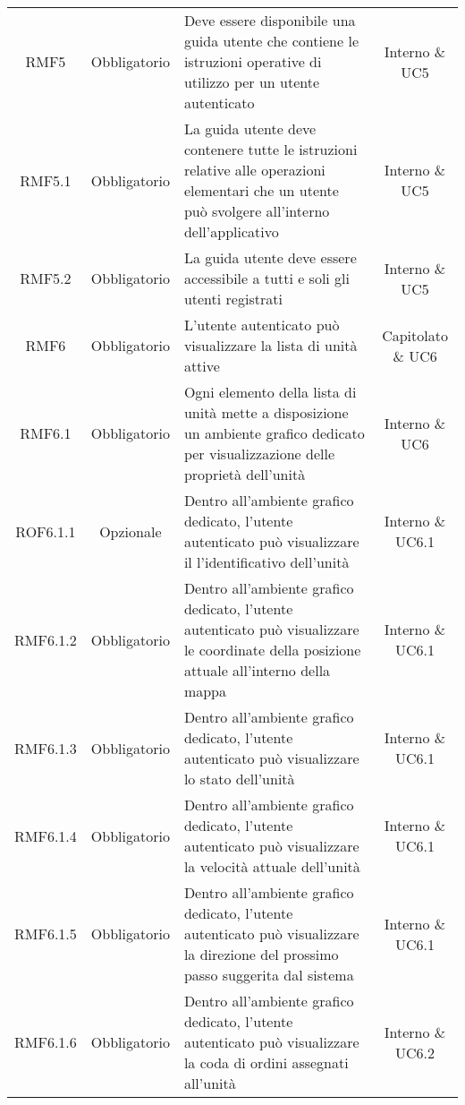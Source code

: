 \begin{longtable}[h!] { c c m{8cm} c}
		RMF5 & Obbligatorio & Deve essere disponibile una guida utente che contiene le istruzioni operative di utilizzo per un utente autenticato & Interno \& UC5 \\

		RMF5.1 & Obbligatorio & La guida utente deve contenere tutte le istruzioni relative alle operazioni elementari che un utente può svolgere all'interno dell'applicativo & Interno \& UC5 \\

		RMF5.2 & Obbligatorio & La guida utente deve essere accessibile a tutti e soli gli utenti registrati & Interno \& UC5 \\

		RMF6 & Obbligatorio & L'utente autenticato può visualizzare la lista di unità attive & Capitolato \& UC6 \\

		RMF6.1 & Obbligatorio & Ogni elemento della lista di unità mette a disposizione un ambiente grafico dedicato per visualizzazione delle proprietà dell'unità & Interno \& UC6 \\

		ROF6.1.1 & Opzionale & Dentro all'ambiente grafico dedicato, l'utente autenticato può visualizzare il l'identificativo dell'unità & Interno \& UC6.1 \\

		RMF6.1.2 & Obbligatorio & Dentro all'ambiente grafico dedicato, l'utente autenticato può visualizzare le coordinate della posizione attuale all'interno della mappa & Interno \& UC6.1 \\

		RMF6.1.3 & Obbligatorio &  Dentro all'ambiente grafico dedicato, l'utente autenticato può visualizzare lo stato dell'unità & Interno \& UC6.1 \\

		RMF6.1.4 & Obbligatorio &  Dentro all'ambiente grafico dedicato, l'utente autenticato può visualizzare la velocità attuale dell'unità & Interno \& UC6.1 \\

		RMF6.1.5 & Obbligatorio &  Dentro all'ambiente grafico dedicato, l'utente autenticato può visualizzare la direzione del prossimo passo suggerita dal sistema & Interno \& UC6.1 \\

		RMF6.1.6 & Obbligatorio &  Dentro all'ambiente grafico dedicato, l'utente autenticato può visualizzare la coda di ordini assegnati all'unità & Interno \& UC6.2 \\


\end{longtable}
